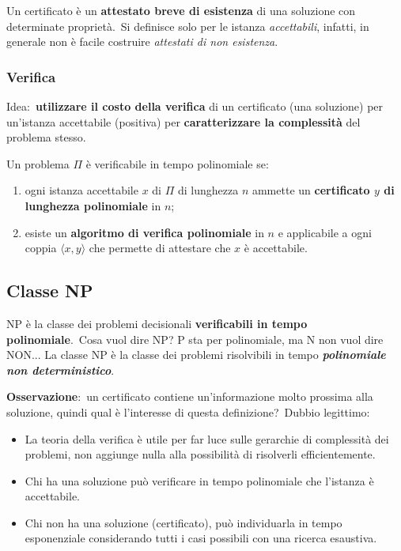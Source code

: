 \noindent Un certificato è un \textbf{attestato breve di esistenza} di una soluzione con determinate proprietà.\
Si definisce solo per le istanza \textit{accettabili}, infatti, in generale non è facile costruire \textit{attestati di non esistenza}.\

\subsubsection{Verifica}

Idea:\ \textbf{utilizzare il costo della verifica} di un certificato (una soluzione) per un'istanza accettabile (positiva) per \textbf{caratterizzare la complessità} del problema stesso.\

Un problema $\Pi$ è verificabile in tempo polinomiale se:\
\begin{enumerate}
    \item ogni {istanza accettabile} $x$ di $\Pi$ di lunghezza $n$ ammette un \textbf{certificato $y$ di lunghezza polinomiale} in $n$;
    \item esiste un \textbf{algoritmo di verifica polinomiale} in $n$ e applicabile a ogni coppia $\langle x,y\rangle$ che permette di attestare che $x$ è accettabile.\
\end{enumerate}

\subsection{Classe NP}

NP è la classe dei problemi decisionali \textbf{verificabili in tempo polinomiale}.\
Cosa vuol dire NP? P sta per polinomiale, ma N non vuol dire NON...
La classe NP è la classe dei problemi risolvibili in tempo \textbf{\textit{polinomiale non deterministico}}.\

\textbf{Osservazione}:\ un certificato contiene un'informazione molto prossima alla soluzione, quindi qual è l'interesse di questa definizione?\
Dubbio legittimo:
\begin{itemize}
    \item La teoria della verifica è utile per far luce sulle gerarchie di complessità dei problemi, non aggiunge nulla alla possibilità di risolverli efficientemente.
    \item Chi ha una soluzione può verificare in tempo polinomiale che l'istanza è accettabile.
    \item Chi non ha una soluzione (certificato), può individuarla in tempo esponenziale considerando tutti i casi possibili con una ricerca esaustiva.
\end{itemize}


